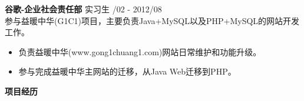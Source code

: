 \documentclass[a4paper]{article}
\newenvironment{changemargin}[2]{%
  \begin{list}{}{%
    \setlength{\topsep}{0pt}%
    \setlength{\leftmargin}{#1}%
    \setlength{\rightmargin}{#2}%
    \setlength{\listparindent}{\parindent}%
    \setlength{\itemindent}{\parindent}%
    \setlength{\parsep}{\parskip}%
  }%
  \item[]}{\end{list}
}
\newcommand{\lineover}{
	\begin{changemargin}{-0.05in}{-0.05in}
		\vspace*{-8pt}
		\hrulefill \\
		\vspace*{-2pt}
	\end{changemargin}
}
\newcommand{\header}[1]{
	\begin{changemargin}{-0.5in}{-0.5in}
	\fontsize{12}{14} \scshape{\textbf{#1}}\\
	\end{changemargin}
}
\newenvironment{body} {
	\vspace*{-16pt}
	\begin{changemargin}{-0.5in}{-0.5in}
  }	
	{\end{changemargin}
}
\begin{document}
\begin{body}
	\vspace{10pt}
	\textbf{谷歌-企业社会责任部} \hfill 实习生 {/02 - 2012/08}\\ 
	\smallskip
	参与益暖中华{\fontarial (G1C1)}项目，主要负责{\fontarial Java+MySQL}以及{\fontarial PHP+MySQL}的网站开发工作。\\ 
	\vspace*{-6pt}
	\begin{itemize} \itemsep -0pt  %
		\item 负责益暖中华{\fontarial(www.gong1chuang1.com)}网站日常维护和功能升级。\\
	\end{itemize}
	\vspace*{-12pt}
	\begin{itemize} \itemsep -0pt  %
		\item 参与完成益暖中华主网站的迁移，从{\fontarial Java Web}迁移到{\fontarial PHP}。\\
	\end{itemize}

\end{body}

\medskip

\header{项目经历}
\end{document}
